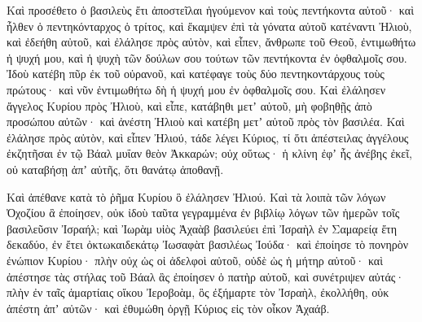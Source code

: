 {Καὶ προσέθετο ὁ βασιλεὺς ἔτι ἀποστεῖλαι ἡγούμενον καὶ τοὺς πεντήκοντα αὐτοῦ· καὶ ἦλθεν ὁ πεντηκόνταρχος ὁ τρίτος, καὶ ἔκαμψεν ἐπὶ τὰ γόνατα αὐτοῦ κατέναντι Ἠλιοὺ, καὶ ἐδεήθη αὐτοῦ, καὶ ἐλάλησε πρὸς αὐτὸν, καὶ εἶπεν, ἄνθρωπε τοῦ Θεοῦ, ἐντιμωθήτω ἡ ψυχή μου, καὶ ἡ ψυχὴ τῶν δούλων σου τούτων τῶν πεντήκοντα ἐν ὀφθαλμοῖς σου.
Ἰδοὺ κατέβη πῦρ ἐκ τοῦ οὐρανοῦ, καὶ κατέφαγε τοὺς δύο πεντηκοντάρχους τοὺς πρώτους· καὶ νῦν ἐντιμωθήτω δὴ ἡ ψυχή μου ἐν ὀφθαλμοῖς σου.
Καὶ ἐλάλησεν ἄγγελος Κυρίου πρὸς Ἠλιοὺ, καὶ εἶπε, κατάβηθι μετʼ αὐτοῦ, μὴ φοβηθῇς ἀπὸ προσώπου αὐτῶν· καὶ ἀνέστη Ἠλιοὺ καὶ κατέβη μετʼ αὐτοῦ πρὸς τὸν βασιλέα.
Καὶ ἐλάλησε πρὸς αὐτὸν, καὶ εἶπεν Ἠλιού, τάδε λέγει Κύριος, τί ὅτι ἀπέστειλας ἀγγέλους ἐκζητῆσαι ἐν τῷ Βάαλ μυΐαν θεὸν Ἀκκαρών; οὐχ οὕτως· ἡ κλίνη ἐφʼ ἧς ἀνέβης ἐκεῖ, οὐ καταβήσῃ ἀπʼ αὐτῆς, ὅτι θανάτῳ ἀποθανῇ.
\par }{\PP {}Καὶ ἀπέθανε κατὰ τὸ ῥῆμα Κυρίου ὃ ἐλάλησεν Ἠλιού.
Καὶ τὰ λοιπὰ τῶν λόγων Ὀχοζίου ἃ ἐποίησεν, οὐκ ἰδοὺ ταῦτα γεγραμμένα ἐν βιβλίῳ λόγων τῶν ἡμερῶν τοῖς βασιλεῦσιν Ἰσραήλ;
καὶ Ἰωρὰμ υἱὸς Ἀχαὰβ βασιλεύει ἐπὶ Ἰσραὴλ ἐν Σαμαρείᾳ ἔτη δεκαδύο, ἐν ἔτει ὀκτωκαιδεκάτῳ Ἰωσαφὰτ βασιλέως Ἰούδα·
καὶ ἐποίησε τὸ πονηρὸν ἐνώπιον Κυρίου· πλὴν οὐχ ὡς οἱ ἀδελφοὶ αὐτοῦ, οὐδὲ ὡς ἡ μήτηρ αὐτοῦ·
καὶ ἀπέστησε τὰς στήλας τοῦ Βάαλ ἃς ἐποίησεν ὁ πατὴρ αὐτοῦ, καὶ συνέτριψεν αὐτάς· πλὴν ἐν ταῖς ἁμαρτίαις οἴκου Ἰεροβοὰμ, ὃς ἐξήμαρτε τὸν Ἰσραὴλ, ἐκολλήθη, οὐκ ἀπέστη ἀπʼ αὐτῶν·
καὶ ἐθυμώθη ὀργῇ Κύριος εἰς τὸν οἶκον Ἀχαάβ.

}
